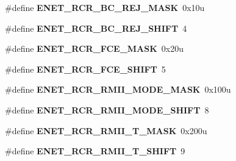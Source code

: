 \begin{DoxyCompactItemize}
\item 
\#define {\bfseries E\+N\+E\+T\+\_\+\+R\+C\+R\+\_\+\+B\+C\+\_\+\+R\+E\+J\+\_\+\+M\+A\+SK}~0x10u\hypertarget{group__ENET__Register__Masks_gaf7ca1d57cd7888b1cb6e0d6834eeba06}{}\label{group__ENET__Register__Masks_gaf7ca1d57cd7888b1cb6e0d6834eeba06}

\item 
\#define {\bfseries E\+N\+E\+T\+\_\+\+R\+C\+R\+\_\+\+B\+C\+\_\+\+R\+E\+J\+\_\+\+S\+H\+I\+FT}~4\hypertarget{group__ENET__Register__Masks_gafbd6d9ebd1bfe9b4271864e5148765ba}{}\label{group__ENET__Register__Masks_gafbd6d9ebd1bfe9b4271864e5148765ba}

\item 
\#define {\bfseries E\+N\+E\+T\+\_\+\+R\+C\+R\+\_\+\+F\+C\+E\+\_\+\+M\+A\+SK}~0x20u\hypertarget{group__ENET__Register__Masks_ga6e58a40675d508a7590ae8bb7839c415}{}\label{group__ENET__Register__Masks_ga6e58a40675d508a7590ae8bb7839c415}

\item 
\#define {\bfseries E\+N\+E\+T\+\_\+\+R\+C\+R\+\_\+\+F\+C\+E\+\_\+\+S\+H\+I\+FT}~5\hypertarget{group__ENET__Register__Masks_ga6e69724dd9dc3b78523a31f53a661f4f}{}\label{group__ENET__Register__Masks_ga6e69724dd9dc3b78523a31f53a661f4f}

\item 
\#define {\bfseries E\+N\+E\+T\+\_\+\+R\+C\+R\+\_\+\+R\+M\+I\+I\+\_\+\+M\+O\+D\+E\+\_\+\+M\+A\+SK}~0x100u\hypertarget{group__ENET__Register__Masks_ga9064baf1508e639692ce75025526d32f}{}\label{group__ENET__Register__Masks_ga9064baf1508e639692ce75025526d32f}

\item 
\#define {\bfseries E\+N\+E\+T\+\_\+\+R\+C\+R\+\_\+\+R\+M\+I\+I\+\_\+\+M\+O\+D\+E\+\_\+\+S\+H\+I\+FT}~8\hypertarget{group__ENET__Register__Masks_ga9920faf83d3b2ac7afe335d818119e14}{}\label{group__ENET__Register__Masks_ga9920faf83d3b2ac7afe335d818119e14}

\item 
\#define {\bfseries E\+N\+E\+T\+\_\+\+R\+C\+R\+\_\+\+R\+M\+I\+I\+\_\+T\+\_\+\+M\+A\+SK}~0x200u\hypertarget{group__ENET__Register__Masks_gad12b342c371a09b9fa529abf0df4df3d}{}\label{group__ENET__Register__Masks_gad12b342c371a09b9fa529abf0df4df3d}

\item 
\#define {\bfseries E\+N\+E\+T\+\_\+\+R\+C\+R\+\_\+\+R\+M\+I\+I\+\_\+T\+\_\+\+S\+H\+I\+FT}~9\hypertarget{group__ENET__Register__Masks_gae380a88454073abac2947ac8a5959880}{}\label{group__ENET__Register__Masks_gae380a88454073abac2947ac8a5959880}


\end{DoxyCompactItemize}
